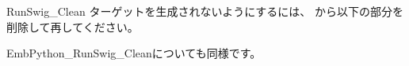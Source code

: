 RunSwig\_Clean ターゲットを生成されないようにするには、
\QCMakeLists{}から以下の部分を削除して再\cmake してください。

\begin{narrow}\begin{figure}[h]
    \begin{narrow}[30pt]
	\begin{center}\end{center}
	\label{fig:SpringheadLibraryTree}
    \end{narrow}
\end{figure}\end{narrow}
	
EmbPython\_RunSwig\_Cleanについても同様です。	

